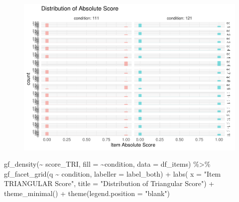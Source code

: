 \documentclass[
  letterpaper,
  DIV=11,
  numbers=noendperiod]{scrreprt}
\newenvironment{Shaded}{\begin{snugshade}}{\end{snugshade}}
\newcommand{\AttributeTok}[1]{\textcolor[rgb]{0.40,0.45,0.13}{#1}}
\newcommand{\FunctionTok}[1]{\textcolor[rgb]{0.28,0.35,0.67}{#1}}
\newcommand{\NormalTok}[1]{\textcolor[rgb]{0.00,0.23,0.31}{#1}}
\newcommand{\SpecialCharTok}[1]{\textcolor[rgb]{0.37,0.37,0.37}{#1}}
\newcommand{\StringTok}[1]{\textcolor[rgb]{0.13,0.47,0.30}{#1}}
\begin{document}
\begin{figure}[H]

{\centering \includegraphics{analysis/SGC3A/2_sgc3A_scoring_files/figure-pdf/unnamed-chunk-83-1.pdf}

}

\end{figure}

\begin{Shaded}
\begin{Highlighting}[]
\FunctionTok{gf\_density}\NormalTok{(}\SpecialCharTok{\textasciitilde{}}\NormalTok{ score\_TRI, }\AttributeTok{fill =} \SpecialCharTok{\textasciitilde{}}\NormalTok{condition, }\AttributeTok{data =}\NormalTok{ df\_items) }\SpecialCharTok{\%\textgreater{}\%} 
  \FunctionTok{gf\_facet\_grid}\NormalTok{(q }\SpecialCharTok{\textasciitilde{}}\NormalTok{ condition, }\AttributeTok{labeller =}\NormalTok{ label\_both) }\SpecialCharTok{+} 
  \FunctionTok{labs}\NormalTok{( }\AttributeTok{x =} \StringTok{"Item TRIANGULAR Score"}\NormalTok{, }\AttributeTok{title =} \StringTok{"Distribution of Triangular Score"}\NormalTok{) }\SpecialCharTok{+} \FunctionTok{theme\_minimal}\NormalTok{() }\SpecialCharTok{+} \FunctionTok{theme}\NormalTok{(}\AttributeTok{legend.position =} \StringTok{"blank"}\NormalTok{)}
\end{Highlighting}
\end{Shaded}
\end{document}
